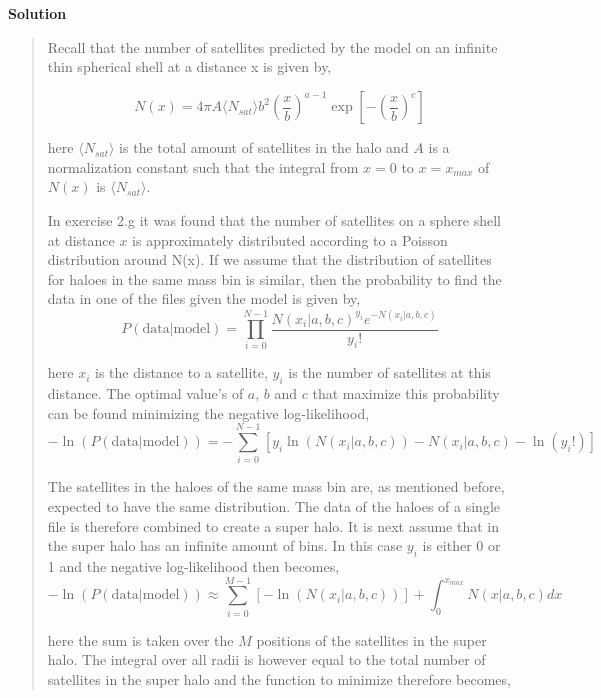 \textbf{Solution}
\begin{quote}
Recall that the number of satellites predicted by the model on an infinite thin spherical shell at a distance x is given by,

\begin{equation}
N(x) = 4\pi A \langle N_{sat} \rangle b^{2} \left(\frac{x}{b} \right)^{a-1} \exp \left[-\left(\frac{x}{b} \right)^c \right]
\label{eq:N}
\end{equation}

here $\langle N_{sat} \rangle$ is the total amount of satellites in the halo and $A$ is a normalization constant such that the integral from $x = 0$ to $x = x_{max}$ of $N(x)$ is $\langle N_{sat} \rangle$.

In exercise 2.g it was found that the number of satellites on a sphere shell at distance $x$ is approximately distributed according to a Poisson distribution around N(x). If we assume that the distribution of satellites for haloes in the same mass bin is similar, then the probability to find the data in one of the files given the model is given by,
\begin{equation}
P(\text{data}|\text{model}) = \prod_{i=0}^{N-1} \frac{N(x_i | a, b, c)^{y_i} e^{-N(x_i | a, b, c)}}{y_i!}
\end{equation}

here $x_i$ is the distance to a satellite, $y_i$ is the number of satellites at this distance.  The optimal value's of $a$, $b$ and $c$ that maximize this probability can be found minimizing the negative log-likelihood,
\begin{equation}
- \ln(P(\text{data}|\text{model})) = -\sum_{i = 0}^{N-1} \left[ y_i \ln(N(x_i | a, b, c)) -N(x_i | a, b, c) - \ln(y_i!) \right]
\label{eq:non_assum}
\end{equation}

The satellites in the haloes of the same mass bin are, as mentioned before, expected to have the same distribution. The data of the haloes of a single file is therefore combined to create a super halo.  It is next assume that in the super halo has an infinite amount of bins.  In this case $y_i$ is either 0 or 1 and the negative log-likelihood then becomes,
\begin{equation}
- \ln(P(\text{data}|\text{model})) \approx \sum_{i=0}^{M-1} \left[- \ln(N(x_i | a, b, c)) \right] + \int_0^{x_{max}} N(x | a, b, c) dx
\end{equation}

here the sum is taken over the $M$ positions of the  satellites in the super halo. The integral over all radii is however equal to the total number of satellites in the super halo and the function to minimize therefore becomes,


\end{quote}
